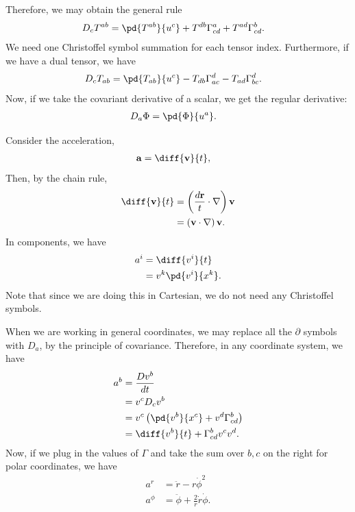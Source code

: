 \documentclass[10pt]{mypackage}
\begin{document}
  Therefore, we may obtain the general rule
  \begin{align*}
    D_cT^{ab} &= \pd{T^{ab}}{u^{c}} + T^{db}\Gamma_{cd}^{a} + T^{ad}\Gamma_{cd}^{b}.
  \end{align*}
  We need one Christoffel symbol summation for each tensor index. Furthermore, if we have a dual tensor, we have
  \begin{align*}
    D_{c}T_{ab} &= \pd{T_{ab}}{u^{c}} - T_{db}\Gamma^{d}_{ac} - T_{ad}\Gamma^{d}_{bc}.
  \end{align*}
  Now, if we take the covariant derivative of a scalar, we get the regular derivative:
  \begin{align*}
    D_a\Phi &= \pd{\Phi}{u^{a}}.
  \end{align*}
  \begin{example}
    Consider the acceleration,
    \begin{align*}
      \mathbf{a} &= \diff{\mathbf{v}}{t},
    \end{align*}
    Then, by the chain rule,
    \begin{align*}
      \diff{\mathbf{v}}{t} &= \left( \frac{d\mathbf{r}}{t}\cdot \nabla \right)\mathbf{v}\\
                           &= \left( \mathbf{v}\cdot \nabla \right)\mathbf{v}.
    \end{align*}
    In components, we have
    \begin{align*}
      a^i &= \diff{v^i}{t}\\
          &= v^{k} \pd{v^{i}}{x^k}.
    \end{align*}
    Note that since we are doing this in Cartesian, we do not need any Christoffel symbols.\newline

    When we are working in general coordinates, we may replace all the $\partial$ symbols with $D_a$, by the principle of covariance. Therefore, in any coordinate system, we have
    \begin{align*}
      a^{b} &= \frac{Dv^{b}}{dt}\\
            &= v^{c}D_cv^{b}\\
            &= v^{c}\left( \pd{v^{b}}{x^{c}} + v^{d}\Gamma^{b}_{cd} \right)\\
            &= \diff{v^{b}}{t} + \Gamma^{b}_{cd}v^cv^d.
    \end{align*}
    Now, if we plug in the values of $\Gamma$ and take the sum over $b,c$ on the right for polar coordinates, we have
    \begin{align*}
      a^{r} &= \ddot{r} - r\dot{\phi}^2\\
      a^{\phi} &= \ddot{\phi} + \frac{2}{r}\dot{r}\dot{\phi}.
    \end{align*}
  \end{example}
\end{document}
